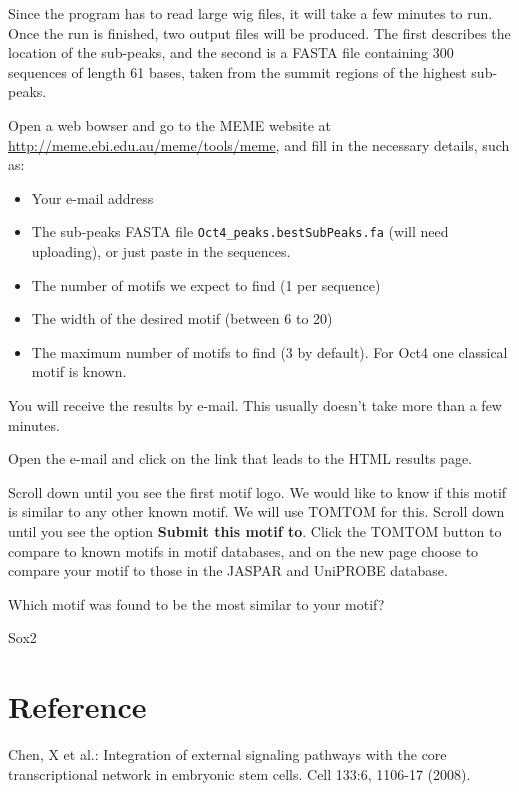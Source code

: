 \begin{information}
Since the program has to read large wig files, it will take a few minutes to
run. Once the run is finished, two output files will be produced. The first
describes the location of the sub-peaks, and the second is a FASTA file
containing 300 sequences of length 61 bases, taken from the summit regions of
the highest sub-peaks.
\end{information}

\begin{steps}
Open a web bowser and go to the MEME website at
\url{http://meme.ebi.edu.au/meme/tools/meme}, and fill in the necessary
details, such as:
\begin{itemize}
	\item Your e-mail address 
	\item The sub-peaks FASTA file \texttt{Oct4\_peaks.bestSubPeaks.fa} (will need uploading), or just paste in the sequences. 
	\item The number of motifs we expect to find (1 per sequence) 
	\item The width of the desired motif (between 6 to 20) 
	\item The maximum number of motifs to find (3 by default). For Oct4 one classical motif is known. 
\end{itemize}
\end{steps}

\begin{note}
You will receive the results by e-mail. This usually doesn't take more than a few minutes.
\end{note}

\begin{steps}
Open the e-mail and click on the link that leads to the HTML results page.

Scroll down until you see the first motif logo. We would like to know if this
motif is similar to any other known motif. We will use TOMTOM for this. Scroll
down until you see the option \textbf{Submit this motif to}. Click the TOMTOM
button to compare to known motifs in motif databases, and on the new page choose
to compare your motif to those in the JASPAR and UniPROBE database.
\end{steps}


\begin{questions}
Which motif was found to be the most similar to your motif?
\begin{answer}
Sox2
\end{answer}
\end{questions}

\newpage
\section{Reference}
Chen, X et al.: Integration of external signaling pathways with the core transcriptional network in embryonic stem cells. Cell 133:6, 1106-17 (2008).
